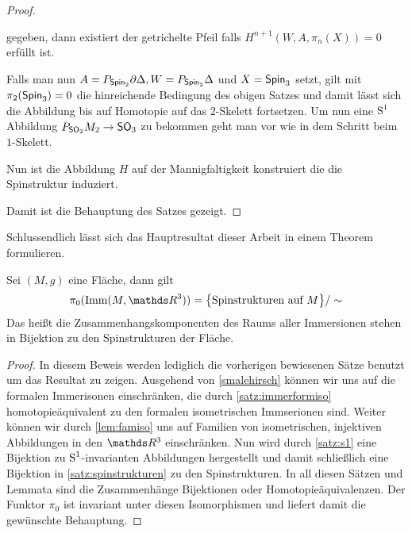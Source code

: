 \begin{Satz}
\begin{proof}
\begin{description}
\begin{enumerate}
\begin{Satz}
\begin{center}
		  	\end{center}
		  	gegeben, dann existiert der getrichelte Pfeil falls $ H^{n+1}(W,A,\pi_n(X)) =0$ erfüllt ist.
		  	\end{Satz}
		  	Falls man nun $ A=\Ph{\spin_2}{\partial\Delta} ,W=\Ph{\spin_2}{\Delta} $ und $ X=\spin_3 $ setzt, gilt mit $ \pi_2(\spin_3)=0 $ die hinreichende
		  	Bedingung des obigen Satzes und damit lässt sich die Abbildung bis
		  	auf Homotopie auf das $ 2 $-Skelett fortsetzen. Um nun eine $\S^1$ Abbildung
		  	$\Ph{\so_2}{M_2} \to \so_3$ zu bekommen geht man vor wie in dem Schritt 
		  	beim $ 1 $-Skelett.
		  \end{enumerate}
		  Nun ist die Abbildung $ H $ auf der Mannigfaltigkeit konstruiert die
		  die Spinstruktur induziert.
          \end{description}
          Damit ist die Behauptung des Satzes gezeigt.
	\end{proof}
\end{Satz}

Schlussendlich lässt sich das Hauptresultat dieser Arbeit in einem Theorem
formulieren.

\begin{Thm}
	Sei $ (M,g) $ eine Fläche, dann gilt 
	\begin{gather*}
	 \pi_0(\Imm{M}{\R^3}) = \sset{\text{Spinstrukturen auf }M}/\sim  
	\end{gather*}
	Das heißt die Zusammenhangskomponenten
	des Raums aller Immersionen stehen in Bijektion zu den Spinstrukturen der Fläche.
	\begin{proof}
		In diesem Beweis werden lediglich die vorherigen bewiesenen Sätze benutzt
		um das Resultat zu zeigen.
		Ausgehend von \cref{smalehirsch} können wir uns auf die formalen Immerisonen
		einschränken, die durch \cref{satz:immerformiso} homotopieäquivalent zu
		den formalen isometrischen Immserionen sind. Weiter können wir durch
		\cref{lem:famiso} uns auf Familien von isometrischen, injektiven Abbildungen
		in den $ \R^3 $ einschränken. Nun wird durch \cref{satz:s1} eine Bijektion
		zu $ \S^1 $-invarianten Abbildungen hergestellt und damit schließlich 
		eine Bijektion in \cref{satz:spinstrukturen} zu den Spinstrukturen.
		In all diesen Sätzen und Lemmata sind die Zusammenhänge Bijektionen oder
		Homotopieäquivalenzen. Der Funktor $ \pi_0 $ ist invariant unter diesen
		Isomorphismen und liefert damit die gewünschte Behauptung.
	\end{proof}
\end{Thm}



